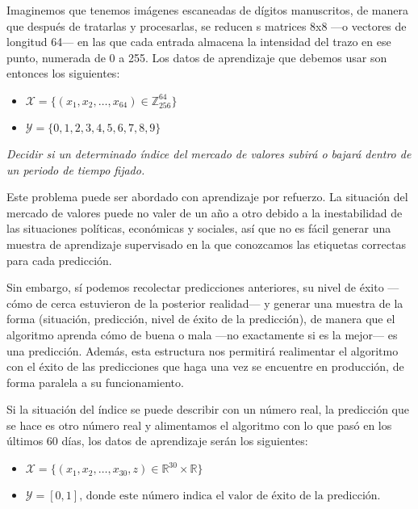 \documentclass[a4paper, 11pt]{article}
\begin{document}
\begin{solucion}
        Imaginemos que tenemos imágenes escaneadas de dígitos manuscritos, de manera que después de tratarlas y procesarlas, se reducen s matrices 8x8 ---o vectores de longitud 64--- en las que cada entrada almacena la intensidad del trazo en ese punto, numerada de 0 a 255.
        Los datos de aprendizaje que debemos usar son entonces los siguientes:
        \begin{itemize}
            \item $\mathcal{X} = \{(x_1, x_2, \dots, x_64) \in \mathbb{Z}_{256}^{64}\}$
            \item $\mathcal{Y} = \{0, 1, 2, 3, 4, 5, 6, 7, 8, 9\}$
        \end{itemize}

        \emph{Decidir si un determinado índice del mercado de valores subirá o bajará dentro de un periodo de tiempo fijado.}

        Este problema puede ser abordado con aprendizaje por refuerzo. La situación del mercado de valores puede no valer de un año a otro debido a la inestabilidad de las situaciones políticas, económicas y sociales, así que no es fácil generar una muestra de aprendizaje supervisado en la que conozcamos las etiquetas correctas para cada predicción.

        Sin embargo, sí podemos recolectar predicciones anteriores, su nivel de éxito ---cómo de cerca estuvieron de la posterior realidad--- y generar una muestra de la forma (situación, predicción, nivel de éxito de la predicción), de manera que el algoritmo aprenda cómo de buena o mala ---no exactamente si es la mejor--- es una predicción. Además, esta estructura nos permitirá realimentar el algoritmo con el éxito de las predicciones que haga una vez se encuentre en producción, de forma paralela a su funcionamiento.

        Si la situación del índice se puede describir con un número real, la predicción que se hace es otro número real y alimentamos el algoritmo con lo que pasó en los últimos 60 días, los datos de aprendizaje serán los siguientes:
        \begin{itemize}
            \item $\mathcal{X} = \{(x_1, x_2, \dots, x_30, z) \in \mathbb{R}^{30} \times \mathbb{R}\}$
            \item $\mathcal{Y} = [0,1] \textrm{, donde este número indica el valor de éxito de la predicción.}$
        \end{itemize}
    \end{solucion}
\end{document}
